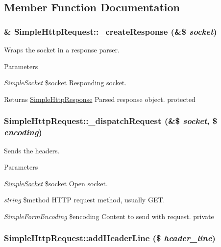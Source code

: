 \subsection{Member Function Documentation}
\hypertarget{class_simple_http_request_a5ae5d9eabfbc855f3566d2c24ac8241e}{
\subsubsection[{\_\-createResponse}]{\setlength{\rightskip}{0pt plus 5cm}\& SimpleHttpRequest::\_\-createResponse (\&\$ {\em socket})}}
\label{class_simple_http_request_a5ae5d9eabfbc855f3566d2c24ac8241e}
Wraps the socket in a response parser. 
\begin{DoxyParams}{Parameters}
\item[{\em \hyperlink{class_simple_socket}{SimpleSocket}}]\$socket Responding socket. \end{DoxyParams}
\begin{DoxyReturn}{Returns}
\hyperlink{class_simple_http_response}{SimpleHttpResponse} Parsed response object.  protected 
\end{DoxyReturn}
\hypertarget{class_simple_http_request_afe234f337f1ac909dc125adb428cfed5}{
\subsubsection[{\_\-dispatchRequest}]{\setlength{\rightskip}{0pt plus 5cm}SimpleHttpRequest::\_\-dispatchRequest (\&\$ {\em socket}, \/  \$ {\em encoding})}}
\label{class_simple_http_request_afe234f337f1ac909dc125adb428cfed5}
Sends the headers. 
\begin{DoxyParams}{Parameters}
\item[{\em \hyperlink{class_simple_socket}{SimpleSocket}}]\$socket Open socket. \item[{\em string}]\$method HTTP request method, usually GET. \item[{\em SimpleFormEncoding}]\$encoding Content to send with request.  private \end{DoxyParams}
\hypertarget{class_simple_http_request_ac0309917a5be6411e7a87fc50fbb4304}{
\subsubsection[{addHeaderLine}]{\setlength{\rightskip}{0pt plus 5cm}SimpleHttpRequest::addHeaderLine (\$ {\em header\_\-line})}}

